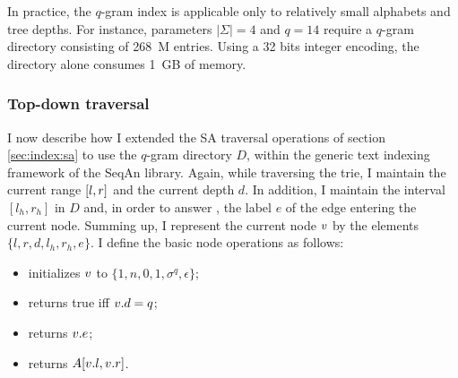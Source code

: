 In practice, the $q$-gram index is applicable only to relatively small alphabets and tree depths.
For instance, parameters $|\Sigma| = 4$ and $q=14$ require a $q$-gram directory consisting of 268~M entries.
Using a 32 bits integer encoding, the directory alone consumes 1~GB of memory.

\subsubsection{Top-down traversal}

I now describe how I extended the SA traversal operations of section \ref{sec:index:sa} to use the $q$-gram directory $D$, within the generic text indexing framework of the SeqAn library.
Again, while traversing the trie, I maintain the current range $[l,r]$ and the current depth $d$.
In addition, I maintain the interval $[l_h,r_h]$ in $D$ and, in order to answer , the label $e$ of the edge entering the current node.
Summing up, I represent the current node $v$ by the elements $\{ l, r, d, l_h, r_h, e \}$.
I define the basic node operations as follows:
\begin{itemize}
\item {} initializes $v$ to $\{ 1, n, 0, 1, \sigma^q, \epsilon \}$;
\item {} returns true iff $v.d=q$;
\item {} returns $v.e$;
\item {} returns $A[v.l,v.r]$.
\end{itemize}

